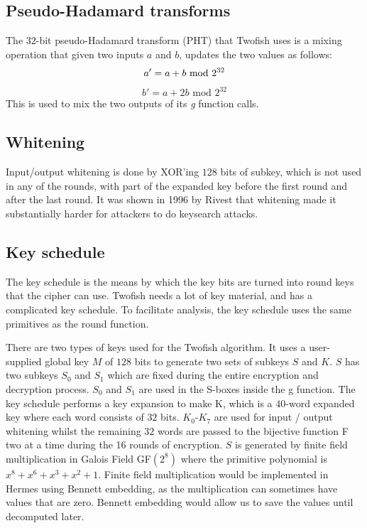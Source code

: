 \subsection{Pseudo-Hadamard transforms}
The $32$-bit pseudo-Hadamard transform (PHT) that Twofish uses is a mixing operation that given two inputs $a$ and $b$, updates the two values as follows:
\begin{equation*}
  a' = a + b\text{ mod }2^{32} \\
\end{equation*}
\begin{equation*}
  b' = a + 2b\text{ mod }2^{32}
\end{equation*}
This is used to mix the two outputs of its \emph{g} function calls.

\subsection{Whitening}
Input/output whitening is done by XOR'ing $128$ bits of subkey, which is not used in any of the rounds, with part of the expanded key before the first round and after the last round. It was shown in 1996 by Rivest\cite{KR96} that whitening made it substantially harder for attackers to do keysearch attacks.

\subsection{Key schedule}
\label{section:key_schedule}
The key schedule is the means by which the key bits are turned into round keys that the cipher can use.  Twofish needs a lot of key material, and has a complicated key schedule. To facilitate analysis, the key schedule uses the same primitives as the round function.

There are two types of keys used for the Twofish algorithm.
It uses a user-supplied global key $M$ of $128$ bits to generate two sets of subkeys $S$ and $K$.
$S$ has two subkeys $S_0$ and $S_1$ which are fixed during the entire encryption and decryption process.
$S_0$ and $S_1$ are used in the S-boxes inside the g function.
The key schedule performs a key expansion to make K, which is a $40$-word expanded key where each word consists of $32$ bits.
$K_0$-$K_7$ are used for input / output whitening whilst the remaining $32$ words are passed to the bijective function F two at a time during the 16 rounds of encryption.
$S$ is generated by finite field multiplication in Galois Field GF$(2^8)$ where the primitive polynomial is $x^8 + x^6 + x^3 + x^2 + 1$.
Finite field multiplication would be implemented in Hermes using Bennett embedding, as the multiplication can sometimes have values that are zero.
Bennett embedding would allow us to save the values until decomputed later.
